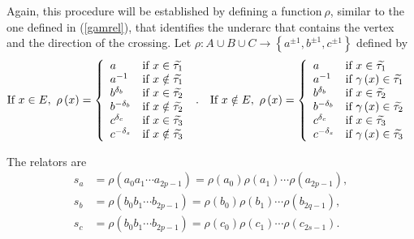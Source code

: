 \documentclass[12pt]{article}%
\begin{document}
Again, this procedure will be established by defining a function$\ \rho$,
similar to the one defined in (\ref{gamrel}), that identifies the underarc that
contains the vertex and the direction of the crossing. Let $\rho:A\cup B\cup
C\rightarrow\left\{  a^{\pm1},b^{\pm1},c^{\pm1}\right\}  $ defined by
\[
\text{If }x\in E,\ \rho\left(  x\right)  =\left\{
\begin{array}
[c]{ll}%
a & \text{if }x\in\widetilde{\tau_{1}}\\
a^{-1} & \text{if }x\notin\widetilde{\tau_{1}}\ \\
b^{\delta_{b}} & \text{if }x\in\widetilde{\tau_{2}}\\
b^{-\delta_{b}} & \text{if }x\notin\widetilde{\tau_{2}}\ \\
c^{\delta_{c}} & \text{if }x\in\widetilde{\tau_{3}}\\
c^{-\delta_{s}} & \text{if }x\notin\widetilde{\tau_{3}}\
\end{array}
\right.  \text{.\ \ \ If\ }x\notin E,\ \rho\left(  x\right)  =\left\{
\begin{array}
[c]{ll}%
a & \text{if }x\in\widetilde{\tau_{1}}\\
a^{-1} & \text{if }\gamma\left(  x\right)  \in\widetilde{\tau_{1}}\ \\
b^{\delta_{b}} & \text{if }x\in\widetilde{\tau_{2}}\\
b^{-\delta_{b}} & \text{if }\gamma\left(  x\right)  \in\widetilde{\tau_{2}%
}\ \\
c^{\delta_{c}} & \text{if }x\in\widetilde{\tau_{3}}\\
c^{-\delta_{s}} & \text{if }\gamma\left(  x\right)  \in\widetilde{\tau_{3}}\
\end{array}
\right.
\]
\label{defro}

The relators are
\begin{align*}
s_{a}  &  =\rho\left(  a_{0}a_{1}\cdots a_{2p-1}\right)  =\rho\left(
a_{0}\right)  \rho\left(  a_{1}\right)  \cdots\rho\left(  a_{2p-1}\right)  ,\\
s_{b}  &  =\rho\left(  b_{0}b_{1}\cdots b_{2p-1}\right)  =\rho\left(
b_{0}\right)  \rho\left(  b_{1}\right)  \cdots\rho\left(  b_{2q-1}\right)  ,\\
s_{c}  &  =\rho\left(  b_{0}b_{1}\cdots b_{2p-1}\right)  =\rho\left(
c_{0}\right)  \rho\left(  c_{1}\right)  \cdots\rho\left(  c_{2s-1}\right)  .
\end{align*}
\end{document}
